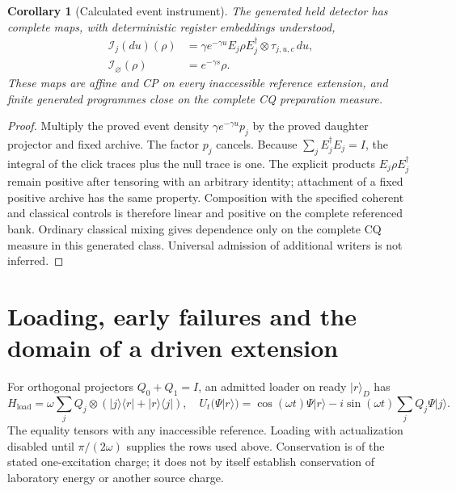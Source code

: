 \documentclass[11pt,oneside,openany]{book}
\newtheorem{corollary}[theorem]{Corollary}
\theoremstyle{definition}
\theoremstyle{remark}\newtheorem{remark}[theorem]{Remark}
\begin{document}
\begin{corollary}[Calculated event instrument]\label{det:intrinsic-instrument}
The generated held detector has complete maps, with deterministic
register embeddings understood,
\begin{align}
 \mathcal I_j(du)(\rho)
  &=\gamma e^{-\gamma u}E_j\rho E_j^\dagger
                   \otimes\tau_{j,u,c}\,du,\nonumber\\
 \mathcal I_{\varnothing}(\rho)&=e^{-\gamma s}\rho.           \label{det:intrinsic-maps}
\end{align}
These maps are affine and CP on every inaccessible reference extension,
and finite generated programmes close on the complete CQ preparation
measure.
\end{corollary}
\begin{proof}
Multiply the proved event density $\gamma e^{-\gamma u}p_j$ by the
proved daughter projector and fixed archive. The factor $p_j$ cancels.
Because $\sum_j E_j^\dagger E_j=I$, the integral of the click traces
plus the null trace is one. The explicit products $E_j\rho E_j^\dagger$
remain positive after tensoring with an arbitrary identity; attachment
of a fixed positive archive has the same property. Composition with
the specified coherent and classical controls is therefore linear and
positive on the complete referenced bank. Ordinary classical mixing
gives dependence only on the complete CQ measure in this generated
class. Universal admission of additional writers is not inferred.
\end{proof}

\section{Loading, early failures and the domain of a driven extension}

For orthogonal projectors $Q_0+Q_1=I$, an admitted loader on ready
$|r\rangle_D$ has
\begin{equation}
 H_{\mathrm{load}}=\omega\sum_j Q_j\otimes
 (|j\rangle\langle r|+|r\rangle\langle j|),
 \quad
 U_t(\Psi|r\rangle)=\cos(\omega t)\Psi|r\rangle
  -i\sin(\omega t)\sum_jQ_j\Psi|j\rangle.       \label{det:loader}
\end{equation}
The equality tensors with any inaccessible reference. Loading with
actualization disabled until $\pi/(2\omega)$ supplies the rows used
above. Conservation is of the stated one-excitation charge; it does
not by itself establish conservation of laboratory energy or another
source charge.
\end{document}
